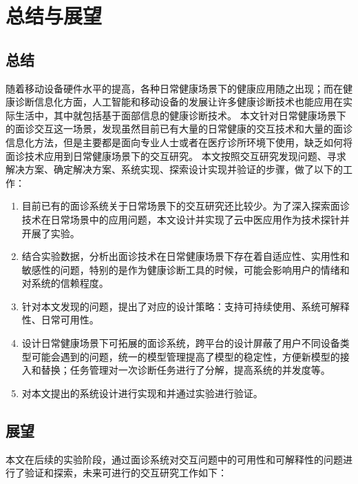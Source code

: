 \chapter{总结与展望}
\section{总结}
随着移动设备硬件水平的提高，各种日常健康场景下的健康应用随之出现；而在健康诊断信息化方面，人工智能和移动设备的发展让许多健康诊断技术也能应用在实际生活中，其中就包括基于面部信息的健康诊断技术。
本文针对日常健康场景下的面诊交互这一场景，发现虽然目前已有大量的日常健康的交互技术和大量的面诊信息化方法，但是主要都是面向专业人士或者在医疗诊所环境下使用，缺乏如何将面诊技术应用到日常健康场景下的交互研究。
本文按照交互研究发现问题、寻求解决方案、确定解决方案、系统实现、探索设计实现并验证的步骤，做了以下的工作：

\begin{enumerate}
	\item 目前已有的面诊系统关于日常场景下的交互研究还比较少。为了深入探索面诊技术在日常场景中的应用问题，本文设计并实现了云中医应用作为技术探针并开展了实验。
	
	\item 结合实验数据，分析出面诊技术在日常健康场景下存在着自适应性、实用性和敏感性的问题，特别的是作为健康诊断工具的时候，可能会影响用户的情绪和对系统的信赖程度。
	
	\item 针对本文发现的问题，提出了对应的设计策略：支持可持续使用、系统可解释性、日常可用性。

	\item 设计日常健康场景下可拓展的面诊系统，跨平台的设计屏蔽了用户不同设备类型可能会遇到的问题，统一的模型管理提高了模型的稳定性，方便新模型的接入和替换；任务管理对一次诊断任务进行了分解，提高系统的并发度等。

	\item 对本文提出的系统设计进行实现和并通过实验进行验证。
\end{enumerate}



\section{展望}
本文在后续的实验阶段，通过面诊系统对交互问题中的可用性和可解释性的问题进行了验证和探索，未来可进行的交互研究工作如下：

